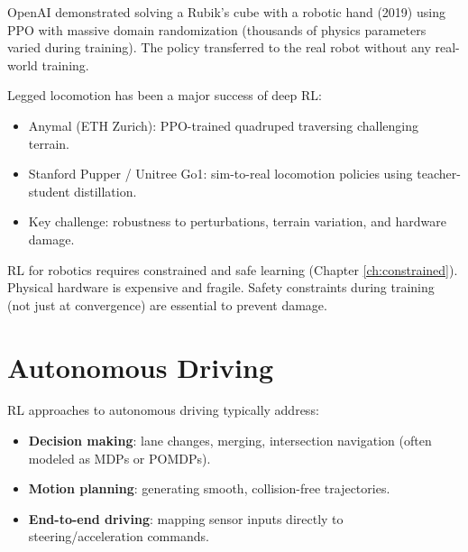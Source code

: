 \begin{example}
OpenAI demonstrated solving a Rubik's cube with a robotic hand (2019)
using PPO with massive domain randomization (thousands of physics
parameters varied during training). The policy transferred to the
real robot without any real-world training.
\end{example}

\begin{example}[Locomotion]
Legged locomotion has been a major success of deep RL:
\begin{itemize}
    \item Anymal (ETH Zurich): PPO-trained quadruped traversing
    challenging terrain.
    \item Stanford Pupper / Unitree Go1: sim-to-real locomotion policies
    using teacher-student distillation.
    \item Key challenge: robustness to perturbations, terrain variation,
    and hardware damage.
\end{itemize}
\end{example}

\begin{attention}[title=\textbf{Safety in Robotics}]
RL for robotics requires constrained and safe learning (Chapter
\ref{ch:constrained}). Physical hardware is expensive and fragile.
Safety constraints during training (not just at convergence) are
essential to prevent damage.
\end{attention}

\section{Autonomous Driving}
\label{sec:app:driving}

\begin{definition}
RL approaches to autonomous driving typically address:
\begin{itemize}
    \item \textbf{Decision making}: lane changes, merging, intersection
    navigation (often modeled as MDPs or POMDPs).
    \item \textbf{Motion planning}: generating smooth, collision-free
    trajectories.
    \item \textbf{End-to-end driving}: mapping sensor inputs directly to
    steering/acceleration commands.
\end{itemize}
\end{definition}

